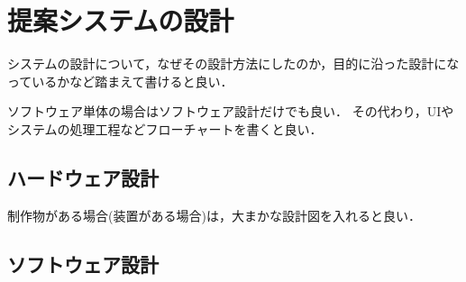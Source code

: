 \chapter{提案システムの設計}
システムの設計について，なぜその設計方法にしたのか，目的に沿った設計になっているかなど踏まえて書けると良い．

ソフトウェア単体の場合はソフトウェア設計だけでも良い．
その代わり，UIやシステムの処理工程などフローチャートを書くと良い．

\section{ハードウェア設計}
制作物がある場合(装置がある場合)は，大まかな設計図を入れると良い．


\section{ソフトウェア設計}
